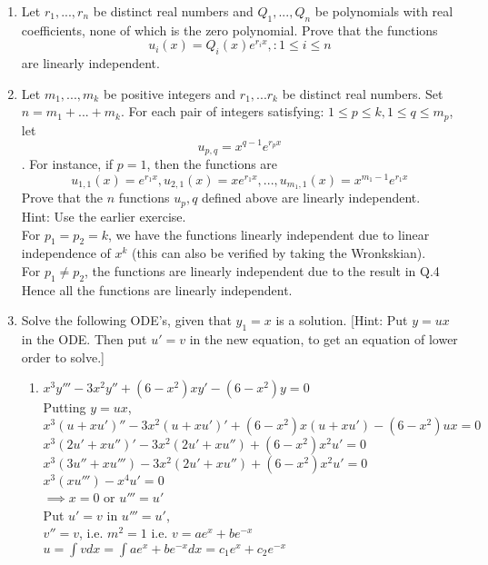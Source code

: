 \documentclass[a4paper]{article}
\begin{document}
\begin{enumerate}
	\onehalfspacing
	\item Let $r_1,...,r_n$ be  distinct real numbers and $Q_1,...,Q_n$ be polynomials with real coefficients, none of which is the zero polynomial. Prove that the functions \[u_i(x) = Q_i(x)e^{r_ix}, : 1 \leq i \leq n\] are linearly independent.\\
	\doublespacing
	
	\onehalfspacing
	\item Let $m_1,...,m_k$ be positive integers and $r_1,...r_k$ be distinct real numbers. Set $n = m_1 + ... + m_k$. For each pair of integers satisfying: $1 \leq p \leq k, 1 \leq q \leq m_p$, let
	\[u_{p,q}=x^{q-1}e^{r_px}\]. For instance, if $p=1$, then the functions are \[u_{1,1}(x)=e^{r_1x}, u_{2,1}(x)=xe^{r_1x},...,u_{m_1,1}(x)=x^{m_1-1}e^{r_1x}\]
	Prove that the $n$ functions $u_p,q$ defined above are linearly independent. \\ Hint: Use the earlier exercise.\\ \doublespacing
	For $p_1=p_2=k$, we have the functions linearly independent due to linear independence of $x^k$ (this can also be verified by taking the Wronkskian).\\
	For $p_1\neq p_2$, the functions are linearly independent due to the result in Q.4\\
	Hence all the functions are linearly independent.
	
	\item  Solve the following ODE’s, given that $y_1 = x$ is a solution. [Hint: Put $y = ux$ in the ODE. Then put $u' = v$ in the new equation, to get an equation of lower order to solve.]
	\begin{enumerate}
		\item \(x^3y''' − 3x^2y'' + (6 − x^2)xy' − (6 − x^2)y = 0\)\\
		Putting $y=ux$,\\
		$x^3 (u+xu')'' - 3x^2(u+xu')' + (6-x^2)x(u+xu') - (6-x^2)ux=0$\\
		$x^3 (2u'+xu'')' - 3x^2(2u'+xu'') + (6-x^2)x^2u'=0$\\
		$x^3 (3u''+xu''') - 3x^2(2u'+xu'') + (6-x^2)x^2u'=0$\\
		$x^3 (xu''') -x^4u'=0$\\
		$\implies x=0$ or $ u'''=u'$\\
		Put $u'=v$ in $u'''=u'$,\\
		$v''=v$, i.e. $m^2=1$ i.e. $v=ae^x + be^{-x}$\\
		$u=\int v dx = \int ae^x +be^{-x} dx = c_1e^x+c_2e^{-x}$
		

\end{enumerate}
\end{enumerate}
\end{document}
